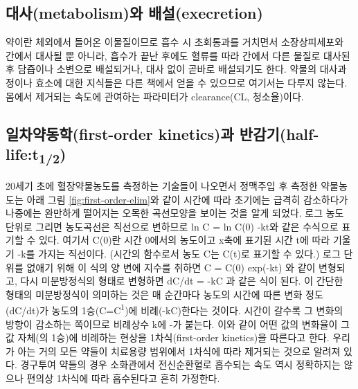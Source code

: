 \documentclass[
  11pt,
  krantz2, a4paper, twoside]{krantz}
\begin{document}
\hypertarget{uxb300uxc0acmetabolismuxc640-uxbc30uxc124execretion}{%
\subsection{대사(metabolism)와 배설(execretion)}\label{uxb300uxc0acmetabolismuxc640-uxbc30uxc124execretion}}

약이란 체외에서 들어온 이물질이므로 흡수 시 초회통과를 거치면서
소장상피세포와 간에서 대사될 뿐 아니라, 흡수가 끝난 후에도 혈류를 따라
간에서 다른 물질로 대사된 후 담즙이나 소변으로 배설되거나, 대사 없이
곧바로 배설되기도 한다. 약물의 대사과정이나 효소에 대한 지식들은 다른
책에서 얻을 수 있으므로 여기서는 다루지 않는다. 몸에서 제거되는 속도에
관여하는 파라미터가 clearance(CL, 청소율)이다.

\hypertarget{uxc77cuxcc28uxc57duxb3d9uxd559first-order-kineticsuxacfc-uxbc18uxac10uxae30half-lifet12}{%
\subsection{\texorpdfstring{일차약동학(first-order kinetics)과 반감기(half-life:t\textsubscript{1/2})}{일차약동학(first-order kinetics)과 반감기(half-life:t1/2)}}\label{uxc77cuxcc28uxc57duxb3d9uxd559first-order-kineticsuxacfc-uxbc18uxac10uxae30half-lifet12}}

20세기 초에 혈장약물농도를 측정하는 기술들이 나오면서 정맥주입 후 측정한
약물농도는 아래 그림 \ref{fig:first-order-elim}와 같이 시간에 따라 초기에는 급격히 감소하다가
나중에는 완만하게 떨어지는 오목한 곡선모양을 보이는 것을 알게 되었다.
로그 농도 단위로 그리면 농도곡선은 직선으로 변하므로 ln C = ln C(0) -kt와 같은 수식으로 표기할 수 있다.
여기서 C(0)란 시간 0에서의 농도이고 x축에 표기된 시간 t에 따라 기울기 -k를 가지는 직선이다. (시간의 함수로서 농도 C는 C(t)로 표기할 수 있다.)
로그 단위를 없애기 위해 이 식의 양 변에 지수를 취하면 C = C(0) exp(-kt) 와 같이 변형되고, 다시 미분방정식의 형태로 변형하면 dC/dt = -kC 과 같은 식이 된다.
이 간단한 형태의 미분방정식이 의미하는 것은 매 순간마다 농도의 시간에 따른 변화 정도(dC/dt)가 농도의 1승(C=C\textsuperscript{1})에 비례(-kC)한다는 것이다.
시간이 갈수록 그 변화의 방향이 감소하는 쪽이므로 비례상수 k에 -가 붙는다.
이와 같이 어떤 값의 변화율이 그 값 자체(의 1승)에 비례하는 현상을 1차식(first-order kinetics)을 따른다고 한다.
우리가 아는 거의 모든 약들이 치료용량 범위에서 1차식에 따라 제거되는 것으로 알려져 있다.
경구투여 약들의 경우 소화관에서 전신순환혈로 흡수되는 속도 역시 정확하지는 않으나 편의상 1차식에 따라 흡수된다고 흔히 가정한다.
\end{document}
